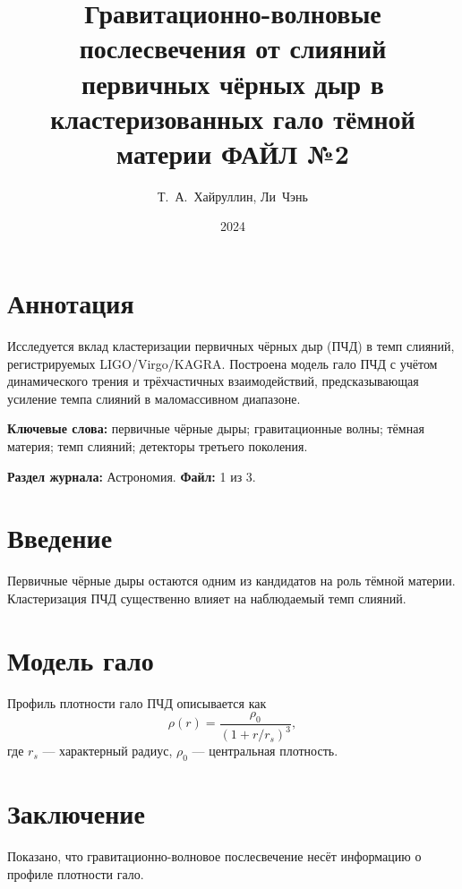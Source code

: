 \documentclass[12pt]{article}
\title{Гравитационно-волновые послесвечения от слияний\\ первичных чёрных дыр в кластеризованных гало тёмной материи ФАЙЛ №2}
\author{Т.~А.~Хайруллин, Ли~Чэнь}
\date{2024}
\begin{document}
\maketitle

\section*{Аннотация}
Исследуется вклад кластеризации первичных чёрных дыр (ПЧД) в темп слияний, регистрируемых LIGO/Virgo/KAGRA. Построена модель гало ПЧД с учётом динамического трения и трёхчастичных взаимодействий, предсказывающая усиление темпа слияний в маломассивном диапазоне.

\vspace{0.5cm}
\noindent\textbf{Ключевые слова:} первичные чёрные дыры; гравитационные волны; тёмная материя; темп слияний; детекторы третьего поколения.

\vspace{0.3cm}
\noindent\textbf{Раздел журнала:} Астрономия. \quad \textbf{Файл:} 1 из 3.

\section{Введение}
Первичные чёрные дыры остаются одним из кандидатов на роль тёмной материи. Кластеризация ПЧД существенно влияет на наблюдаемый темп слияний.

\section{Модель гало}
Профиль плотности гало ПЧД описывается как
\begin{equation}
\rho(r) = \frac{\rho_0}{\left(1 + r/r_s\right)^{3}},
\end{equation}
где $r_s$ — характерный радиус, $\rho_0$ — центральная плотность.

\section{Заключение}
Показано, что гравитационно-волновое послесвечение несёт информацию о профиле плотности гало.
\end{document}
